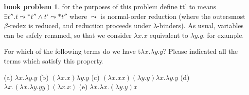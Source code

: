 \documentclass[10pt]{article}
\theoremstyle{definition}
\newtheorem{bp}{book problem}
\begin{document}
\begin{bp}
	for the purposes of this problem define  t\textdownarrow t' to means $\exists t''.t \leadsto* t'' \wedge t' \leadsto * t'' $ where $\leadsto$ is normal-order reduction (where the outersmost $\beta$-redex is reduced, and reduction proceeds under $\lambda$-binders). As usual, variables can be safely renamed, so that we consider $\lambda x.x$ equivalent to $\lambda y.y$, for example.

	For which of the following terms do we have t\textdownarrow$\lambda x.\lambda y.y$? Please indicated all the terms which satisfy this property.

	(a) $\lambda x. \lambda y.y$ \newline
	(b) $(\lambda x.x) \lambda y.y$ \newline
	(c) $( \lambda x.x x)( \lambda y.y) \lambda x. \lambda y.y$ \newline
	(d) $ \lambda x.( \lambda x. \lambda y.y y)( \lambda x.x)$ \newline
	(e) $ \lambda x.\lambda x.(\lambda y.y)x$
\end{bp}
\end{document}
